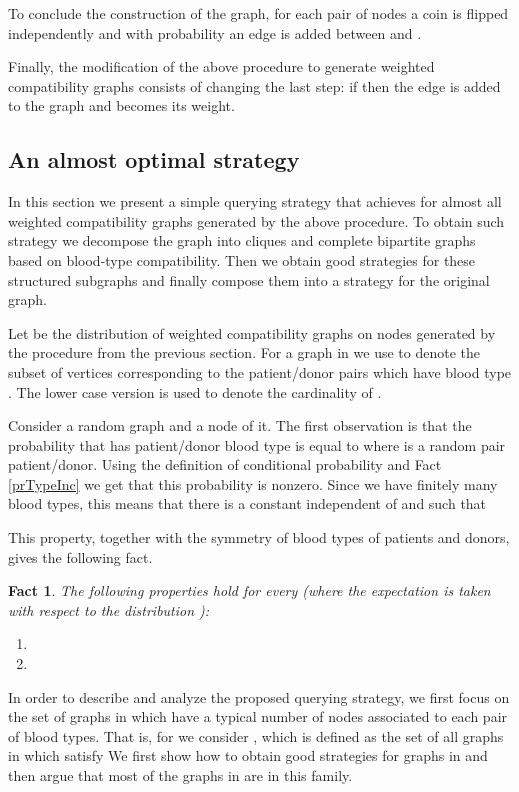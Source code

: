 \documentclass[12pt]{article}
\newtheorem{fact}{Fact}
\begin{document}
	To conclude the construction of the graph, for each pair of nodes  a coin is flipped independently and with probability  an edge is added between  and . 
		
		Finally, the modification of the above procedure to generate weighted compatibility graphs consists of changing the last step: if  then the edge  is added to the graph and  becomes its weight.
		
		\subsection{An almost optimal strategy}

		In this section we present a simple querying strategy that achieves  for almost all weighted compatibility graphs  generated by the above procedure. To obtain such strategy we decompose the graph into cliques and complete bipartite graphs based on blood-type compatibility. Then we obtain good strategies for these structured subgraphs and finally compose them into a strategy for the original graph.
		
		Let  be the distribution of weighted compatibility graphs on  nodes generated by the procedure from the previous section. For a graph  in  we use  to denote the subset of vertices corresponding to the patient/donor pairs which have blood type . The lower case version  is used to denote the cardinality of . 
		
		Consider a random graph  and a node  of it. The first observation is that the probability that  has patient/donor blood type  is equal to  where  is a random pair patient/donor. Using the definition of conditional probability and Fact \ref{prTypeInc} we get that this probability is nonzero. Since we have finitely many blood types, this means that there is a constant  independent of  and  such that 

		This property, together with the symmetry of blood types of patients and donors, gives the following fact.
		
		\begin{fact} \label{sizeBloodTypes}
			The following properties hold for every  (where the expectation is taken with respect to the distribution ):
			\begin{enumerate}
				\item 
				\item 
			\end{enumerate}
		\end{fact}
		
		In order to describe and analyze the proposed querying strategy, we first focus on the set of graphs in  which have a typical number of nodes associated to each pair of blood types. That is, for  we consider , which is defined as the set of all graphs  in  which satisfy  We first show how to obtain good strategies for graphs in  and then argue that most of the graphs in  are in this family. 
		
\end{document}
